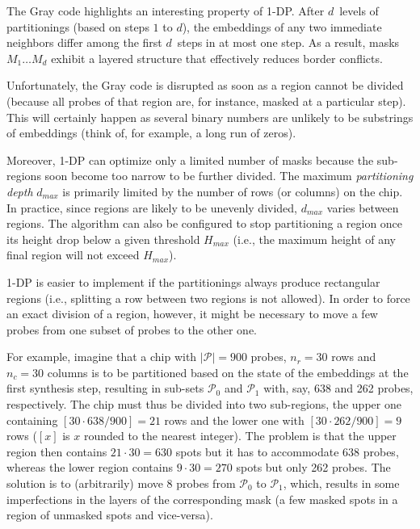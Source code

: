 The Gray code highlights an interesting property of 1-DP. After $d$~levels of
partitionings (based on steps $1$ to $d$), the embeddings of any two immediate
neighbors differ among the first $d$~steps in at most one step.  As a result,
masks $M_1 \dots M_d$ exhibit a layered structure that effectively reduces
border conflicts.

Unfortunately, the Gray code is disrupted as soon as a region cannot be divided
(because all probes of that region are, for instance, masked at a particular
step). This will certainly happen as several binary numbers are unlikely to be
substrings of embeddings (think of, for example, a long run of zeros).

Moreover, 1-DP can optimize only a limited number of masks because the
sub-regions soon become too narrow to be further divided. The maximum
\emph{partitioning depth} $d_{max}$ is primarily limited by the number of rows
(or columns) on the chip. In practice, since regions are likely to be unevenly
divided, $d_{max}$ varies between regions. The algorithm can also be configured
to stop partitioning a region once its height drop below a given threshold
$H_{max}$ (i.e., the maximum height of any final region will not exceed
$H_{max}$).

1-DP is easier to implement if the partitionings always produce rectangular
regions (i.e., splitting a row between two regions is not allowed). In order to
force an exact division of a region, however, it might be necessary to move a
few probes from one subset of probes to the other one.

For example, imagine that a chip with $|\mathcal{P}| = 900$ probes, $n_r = 30$
rows and $n_c = 30$ columns is to be partitioned based on the state of the
embeddings at the first synthesis step, resulting in sub-sets $\mathcal{P}_0$
and $\mathcal{P}_1$ with, say, 638 and 262 probes, respectively. The chip must
thus be divided into two sub-regions, the upper one containing
$[30 \cdot 638/900]=21$ rows and the lower one with $[30 \cdot 262/900]=9$ rows
($[x]$ is $x$ rounded to the nearest integer). The problem is that the upper
region then contains $21 \cdot 30 = 630$ spots but it has to accommodate 638
probes, whereas the lower region contains $9 \cdot 30 = 270$ spots but only 262
probes. The solution is to (arbitrarily) move 8 probes from $\mathcal{P}_0$ to
$\mathcal{P}_1$, which, results in some imperfections in the layers of the
corresponding mask (a few masked spots in a region of unmasked spots and
vice-versa).

